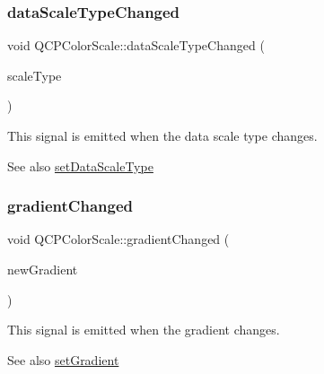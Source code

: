 \subsubsection{\texorpdfstring{data\+Scale\+Type\+Changed}{dataScaleTypeChanged}}
{\footnotesize\ttfamily void Q\+C\+P\+Color\+Scale\+::data\+Scale\+Type\+Changed (\begin{DoxyParamCaption}\item[{\hyperlink{class_q_c_p_axis_a36d8e8658dbaa179bf2aeb973db2d6f0}{Q\+C\+P\+Axis\+::\+Scale\+Type}}]{scale\+Type }\end{DoxyParamCaption})\hspace{0.3cm}{\ttfamily [signal]}}

This signal is emitted when the data scale type changes.

\begin{DoxySeeAlso}{See also}
\hyperlink{class_q_c_p_color_scale_aeb6107d67dd7325145b2498abae67fc3}{set\+Data\+Scale\+Type} 
\end{DoxySeeAlso}
\mbox{\label{class_q_c_p_color_scale_a67a5eb06cf551d322885e8635a46378c}} 
\subsubsection{\texorpdfstring{gradient\+Changed}{gradientChanged}}
{\footnotesize\ttfamily void Q\+C\+P\+Color\+Scale\+::gradient\+Changed (\begin{DoxyParamCaption}\item[{\hyperlink{class_q_c_p_color_gradient}{Q\+C\+P\+Color\+Gradient}}]{new\+Gradient }\end{DoxyParamCaption})\hspace{0.3cm}{\ttfamily [signal]}}

This signal is emitted when the gradient changes.

\begin{DoxySeeAlso}{See also}
\hyperlink{class_q_c_p_color_scale_a1f29583bb6f1e7f473b62fb712be3940}{set\+Gradient} 
\end{DoxySeeAlso}
\mbox{\label{class_q_c_p_color_scale_a3aca469d531ce7b5882de73590aa0de6}} 

